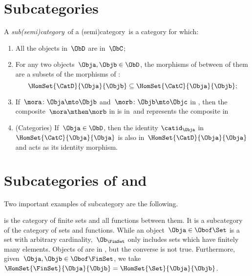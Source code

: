 
\section{Subcategories}
\label{sec:subcategories}



\begin{ctdefinition}[Subcategory]
    \label{def:subcategory}
    A \emph{sub(semi)category}~\CatD of a (semi)category~\CatC is a category for which:
    \begin{enumerate}
        \item All the objects in~$\ObD$ are in~$\ObC$;
        \item For any two objects~$\Obja,\Objb\in \ObD$,
              the morphisms of \CatD between of them are a subsets of the morphisms of \CatC:
              \begin{equation}
                  \HomSet{\CatD}{\Obja}{\Objb}\subseteq \HomSet{\CatC}{ \Obja}{\Objb};
              \end{equation}
        \item If~$\mora \colon \Obja \mto \Objb$ and~$\morb\colon \Objb\mto \Objc$ in \CatD, then the composite~$\mora \mthen \morb$ in \CatC is in~\CatD and represents the composite in~\CatD
        \item (Categories) If~$\Obja\in \ObD$, then the identity $\catid_\Obja$ in $\HomSet{\CatC}{\Obja}{\Obja}$ is also in~$\HomSet{\CatD}{\Obja}{\Obja}$ and acts as its identity morphism.
    \end{enumerate}
\end{ctdefinition}

\section{Subcategories of \Rel and \Set}

Two important examples of subcategory are the following.

\begin{example}
    \label{ex:FinSet}
    \iindex{\FinSet} is the category of finite sets and all functions between them.
    It is a subcategory of the category \Set of sets and functions.
    While an object~$\Obja \in \Obof\Set$ is a set with arbitrary cardinality,~$\Ob_{\FinSet}$ only includes sets which have finitely many elements.
    Objects of \FinSet are in \Set, but the converse is not true.
    Furthermore, given~$\Obja,\Objb\in \Obof\FinSet$, we take~$\HomSet{\FinSet}{\Obja}{\Objb} =\HomSet{\Set}{\Obja}{\Objb}$.
\end{example}

